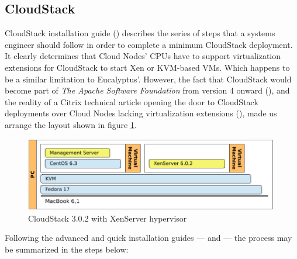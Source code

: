 \subsection{CloudStack}\label{subsec:cloudstack}

\noindent CloudStack installation guide (\cite{cloudstackquickinstall}) describes the series of steps that a systems engineer should follow in order to complete a minimum CloudStack deployment. It clearly determines that Cloud Nodes' CPUs have to support virtualization extensions for CloudStack to start Xen or KVM-based VMs. Which happens to be a similar limitation to Eucalyptus'. However, the fact that CloudStack would become part of \emph{The Apache Software Foundation} from version 4 onward (\cite{cloudstackstrategy}), and the reality of a Citrix technical article opening the door to CloudStack deployments over Cloud Nodes lacking virtualization extensions (\cite{apachecloudstack4}), made us arrange the layout shown in figure \ref{fig:cloudstack}.

\begin{figure}[tbp]
\begin{center}
\includegraphics[width=0.99\textwidth]{imagenes/008.pdf}
 \caption{CloudStack 3.0.2 with XenServer hypervisor}
\label{fig:cloudstack}
\end{center}
\end{figure}

Following the advanced and quick installation guides --- \cite{cloudstackquickinstall} and \cite{cloudstackadvinstall} --- the process may be summarized in the steps below:

